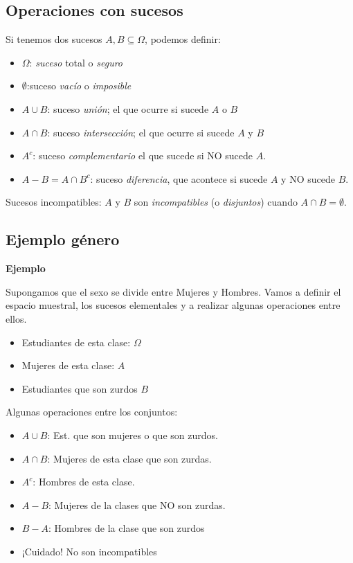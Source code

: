 \documentclass[]{book}
\providecommand{\tightlist}{%
  \setlength{\itemsep}{0pt}\setlength{\parskip}{0pt}}
\begin{document}
\hypertarget{operaciones-con-sucesos}{%
\subsection{Operaciones con sucesos}\label{operaciones-con-sucesos}}

Si tenemos dos sucesos \(A,B\subseteq \Omega\), podemos definir:

\begin{itemize}
\tightlist
\item
  \(\Omega\): \emph{suceso} total o \emph{seguro}
\item
  \(\emptyset\):suceso \emph{vacío} o \emph{imposible}
\item
  \(A\cup B\): suceso \emph{unión}; el que ocurre si sucede \(A\) o \(B\)
\item
  \(A\cap B\): suceso \emph{intersección}; el que ocurre si sucede \(A\) y \(B\)
\item
  \(A^c\): suceso \emph{complementario} el que sucede si NO sucede \(A\).
\item
  \(A- B=A\cap B^c\): suceso \emph{diferencia}, que acontece si sucede \(A\) y NO sucede \(B\).
\end{itemize}

 Sucesos incompatibles: \(A\) y \(B\) son \emph{incompatibles} (o \emph{disjuntos}) cuando \(A\cap B=\emptyset\).

\hypertarget{ejemplo-guxe9nero}{%
\subsection{Ejemplo género}\label{ejemplo-guxe9nero}}

\textbf{Ejemplo}

Supongamos que el sexo se divide entre Mujeres y Hombres. Vamos a definir el espacio muestral, los sucesos elementales y a realizar algunas operaciones entre ellos.

\begin{itemize}
\tightlist
\item
  Estudiantes de esta clase: \(\Omega\)
\item
  Mujeres de esta clase: \(A\)
\item
  Estudiantes que son zurdos \(B\)
\end{itemize}

Algunas operaciones entre los conjuntos:

\begin{itemize}
\tightlist
\item
  \(A\cup B\): Est. que son mujeres o que son zurdos.
\item
  \(A\cap B\): Mujeres de esta clase que son zurdas.
\item
  \(A^c\): Hombres de esta clase.
\item
  \(A-B\): Mujeres de la clases que NO son zurdas.
\item
  \(B-A\): Hombres de la clase que son zurdos
\item
  ¡Cuidado! No son incompatibles
\end{itemize}
\end{document}
